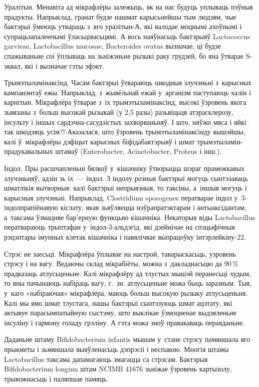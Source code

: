 Уралітын. Менавіта ад мікрафлёры залежыць, як на нас будуць уплываць пэўныя прадукты. Напрыклад, гранат будзе нашмат карысьнейшы тым людзям, чые бактэрыі ўмеюць утвараць з~яго уралітын-А, які валодае моцнымі ахоўнымі і супрацьзапаленчымі ўласьцівасьцямі. А вось наяўнасьць бактэрыяў Lactococcus garvieae, Lactobacillus mucosae, Bacteroides ovatus вызначае, ці будзе спажываньне соі ўплываць на зьніжэньне рызыкі раку грудзей, бо яна ўтварае S-эквал, які і вызначае гэты эфэкт.

Трымэтыламінаксінд. Часам бактэрыі ўтвараюць шкодныя злучэньні з~карысных кампанэнтаў ежы. Напрыклад, з~жывёльнай ежай у~арганізм паступаюць халін і карнітын. Мікрафлёра ўтварае з~іх трымэтыламінаксінд, высокі ўзровень якога зьвязаны з~больш высокай рызыкай (у 2,5 разы) разьвіцьця атэрасклерозу, інсульту і іншых сардэчна-сасудзістых захворваньняў. І што, няўжо мяса і яйкі так шкодзяць усім?! Аказалася, што ўзровень трымэтыламінаксінду вышэйшы, калі ў~мікрафлёры дэфіцыт карысных біфідабактэрыяў і шмат трымэтыламін-прадукавальных штамаў (Enterobacter, Acinetobacter, Proteus і інш.).

Індол. Пры расшчапленьні бялкоў у~кішачніку ўтворыцца шэраг прамежкавых злучэньняў, адзін зь іх~--- індол. З індолу розныя бактэрыі могуць сынтэзаваць шматлікія вытворныя: калі бактэрыі непрыязныя, то таксіны, а~іншыя могуць і карысныя злучэньні. Напрыклад, Clostridium sporogenes ператварае індол у~3-індолпрапіёнавую кіслату, якая зьяўляецца нэўрапратэктарам і антыаксідантам, а~таксама ўзмацняе бар'ерную функцыю кішачніка. Некаторыя віды Lactobacillus ператвараюць трыптафан у~індол-3-альдэгід, які дзейнічае на спэцыфічныя рэцэптары імунных клетак кішачніка і павялічвае выпрацоўку інтэрлейкіну-22.

Стрэс не заесьці. Мікрафлёра ўплывае на настрой, таварыскасьць, узровень стрэсу і на вагу. Ведаючы склад мікрабіёты, можна з~дакладнасьцю да 90\,\% прадказаць атлусьценьне. Калі мікрафлёру ад тлустых мышэй перанесьці худым, то яны пачынаюць набіраць вагу, г.~зн. атлусьценьне можа быць заразным. Тыя, у~каго «набіраючая» мікрафлёра, маюць больш высокую рызыку атлусьценьня. Калі мы ямо шмат тлустага, нашы бактэрыі сынтэзуюць шмат ацэтату, які актывуе парасымпатыйную сыстэму, што выклікае ўзмоцненае выдзяленьне інсуліну і гармону голаду грэліну. А гэта можа зноў правакаваць пераяданьне.

Даданьне штаму Bifidobacterium infantis мышам у~стане стрэсу памяншала яго прыкметы і зьмяншала выяўленасьць дэпрэсіі і неспакою. Многія штамы Lactobacillus таксама дапамагаюць змагацца са стрэсам. Бактэрыя Bifidobacterium longum штам NCIMB 41676 зьніжае ўзровень картызолу, трывожнасьць і паляпшае памяць.

